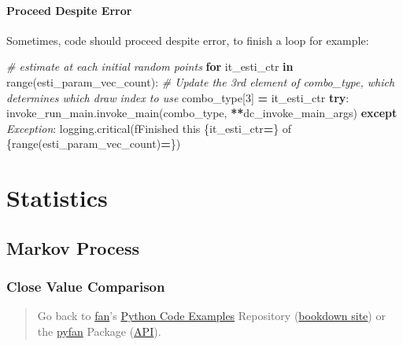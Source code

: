 \documentclass[
]{book}
\newenvironment{Shaded}{\begin{snugshade}}{\end{snugshade}}
\newcommand{\BuiltInTok}[1]{#1}
\newcommand{\CommentTok}[1]{\textcolor[rgb]{0.56,0.35,0.01}{\textit{#1}}}
\newcommand{\ControlFlowTok}[1]{\textcolor[rgb]{0.13,0.29,0.53}{\textbf{#1}}}
\newcommand{\DecValTok}[1]{\textcolor[rgb]{0.00,0.00,0.81}{#1}}
\newcommand{\KeywordTok}[1]{\textcolor[rgb]{0.13,0.29,0.53}{\textbf{#1}}}
\newcommand{\NormalTok}[1]{#1}
\newcommand{\OperatorTok}[1]{\textcolor[rgb]{0.81,0.36,0.00}{\textbf{#1}}}
\newcommand{\PreprocessorTok}[1]{\textcolor[rgb]{0.56,0.35,0.01}{\textit{#1}}}
\newcommand{\SpecialCharTok}[1]{\textcolor[rgb]{0.00,0.00,0.00}{#1}}
\newcommand{\SpecialStringTok}[1]{\textcolor[rgb]{0.31,0.60,0.02}{#1}}
\begin{document}
\hypertarget{proceed-despite-error}{%
\subsubsection{Proceed Despite Error}\label{proceed-despite-error}}

Sometimes, code should proceed despite error, to finish a loop for example:

\begin{Shaded}
\begin{Highlighting}[]
\CommentTok{\# estimate at each initial random points}
\ControlFlowTok{for}\NormalTok{ it\_esti\_ctr }\KeywordTok{in} \BuiltInTok{range}\NormalTok{(esti\_param\_vec\_count):}
    \CommentTok{\# Update the 3rd element of combo\_type, which determines which draw index to use}
\NormalTok{    combo\_type[}\DecValTok{3}\NormalTok{] }\OperatorTok{=}\NormalTok{ it\_esti\_ctr}
    \ControlFlowTok{try}\NormalTok{:}
\NormalTok{        invoke\_run\_main.invoke\_main(combo\_type, }\OperatorTok{**}\NormalTok{dc\_invoke\_main\_args)}
    \ControlFlowTok{except} \PreprocessorTok{Exception}\NormalTok{:}
\NormalTok{        logging.critical(}\SpecialStringTok{f\textquotesingle{}Finished this }\SpecialCharTok{\{}\NormalTok{it\_esti\_ctr}\OperatorTok{=}\SpecialCharTok{\}}\SpecialStringTok{ of }\SpecialCharTok{\{}\BuiltInTok{range}\NormalTok{(esti\_param\_vec\_count)}\OperatorTok{=}\SpecialCharTok{\}}\SpecialStringTok{\textquotesingle{}}\NormalTok{)}
\end{Highlighting}
\end{Shaded}

\hypertarget{statistics}{%
\chapter{Statistics}\label{statistics}}

\hypertarget{markov-process}{%
\section{Markov Process}\label{markov-process}}

\hypertarget{close-value-comparison}{%
\subsection{Close Value Comparison}\label{close-value-comparison}}

\begin{quote}
Go back to \href{http://fanwangecon.github.io/}{fan}'s \href{https://fanwangecon.github.io/Py4Econ/}{Python Code Examples} Repository (\href{https://fanwangecon.github.io/Py4Econ/bookdown}{bookdown site}) or the \href{https://pyfan.readthedocs.io/en/latest/}{pyfan} Package (\href{https://pyfan.readthedocs.io/en/latest/reference.html}{API}).
\end{quote}
\end{document}
